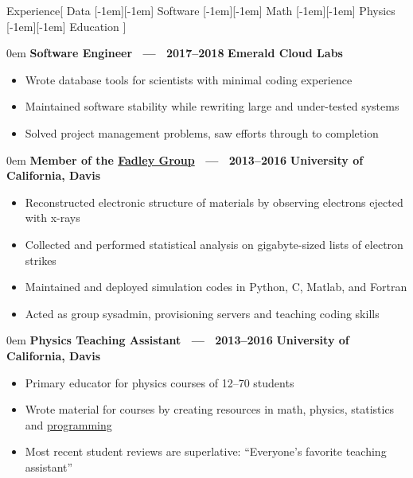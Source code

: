 \documentclass[11pt,a4paper]{article}
\newenvironment{headedsection}[2]{
    \begin{addmargin}[0.5em]{0em}
    {\large\bfseries #1} \hfill {\bfseries #2}%
    \begin{itemize}
        [label={}, topsep=0pt, itemsep=1.5pt, parsep=0pt, leftmargin=1.5em]
}{
    \end{itemize}
    \end{addmargin}
    \medskip
}
\newcommand*\sbull{%
    \raisebox{-0.550ex}[-1em][-1em]{\textscale{4}{\( \cdot \)}}\xspace
}
\begin{document}
\sloppy  %


\vspace{1em}

\begin{mysection}{Experience}[
    Data \sbull{} Software \sbull{} Math \sbull{} Physics \sbull{} Education
]

    \begin{headedsection}
        {Software Engineer \ --- \ 2017--2018}{Emerald Cloud Labs}

        \item Wrote database tools for scientists with minimal coding
            experience
        \item Maintained software stability while rewriting large and
            under-tested systems
        \item Solved project management problems, saw efforts through to
            completion
    \end{headedsection}

    \begin{headedsection}
          {Member of the
            \href{http://www.physics.ucdavis.edu/fadleygroup/}{Fadley Group}
             \ --- \ 2013--2016}
          {University of California, Davis}

        \item Reconstructed electronic structure of materials by observing
            electrons ejected with x-rays
        \item Collected and performed statistical analysis on gigabyte-sized
            lists of electron strikes
        \item Maintained and deployed simulation codes in Python, C, Matlab,
            and Fortran
        \item Acted as group sysadmin, provisioning servers and teaching coding
             skills
    \end{headedsection}

    \begin{headedsection}
          {Physics Teaching Assistant  \ --- \ 2013--2016}
          {University of California, Davis}

        \item Primary educator for physics courses of 12--70 students
        \item Wrote material for courses by creating resources in math, physics,
            statistics and
            \href{https://github.com/jgarst/AdvancedLab/releases/download/spring_2016/Python-FirstSteps.pdf}
                {programming}
        \item Most recent student reviews are superlative:
            ``Everyone's favorite teaching assistant''
    \end{headedsection}


\end{mysection}
\end{document}
